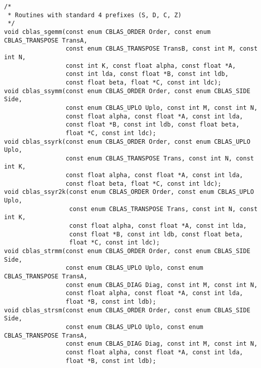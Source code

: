 \documentclass{article}
\begin{document}
\begin{Verbatim}[fontsize=\small,fontfamily=tt,fontshape=rm]
/* 
 * Routines with standard 4 prefixes (S, D, C, Z)
 */
void cblas_sgemm(const enum CBLAS_ORDER Order, const enum CBLAS_TRANSPOSE TransA,
                 const enum CBLAS_TRANSPOSE TransB, const int M, const int N,
                 const int K, const float alpha, const float *A,
                 const int lda, const float *B, const int ldb,
                 const float beta, float *C, const int ldc);
void cblas_ssymm(const enum CBLAS_ORDER Order, const enum CBLAS_SIDE Side,
                 const enum CBLAS_UPLO Uplo, const int M, const int N,
                 const float alpha, const float *A, const int lda,
                 const float *B, const int ldb, const float beta,
                 float *C, const int ldc);
void cblas_ssyrk(const enum CBLAS_ORDER Order, const enum CBLAS_UPLO Uplo,
                 const enum CBLAS_TRANSPOSE Trans, const int N, const int K,
                 const float alpha, const float *A, const int lda,
                 const float beta, float *C, const int ldc);
void cblas_ssyr2k(const enum CBLAS_ORDER Order, const enum CBLAS_UPLO Uplo,
                  const enum CBLAS_TRANSPOSE Trans, const int N, const int K,
                  const float alpha, const float *A, const int lda,
                  const float *B, const int ldb, const float beta,
                  float *C, const int ldc);
void cblas_strmm(const enum CBLAS_ORDER Order, const enum CBLAS_SIDE Side,
                 const enum CBLAS_UPLO Uplo, const enum CBLAS_TRANSPOSE TransA,
                 const enum CBLAS_DIAG Diag, const int M, const int N,
                 const float alpha, const float *A, const int lda,
                 float *B, const int ldb);
void cblas_strsm(const enum CBLAS_ORDER Order, const enum CBLAS_SIDE Side,
                 const enum CBLAS_UPLO Uplo, const enum CBLAS_TRANSPOSE TransA,
                 const enum CBLAS_DIAG Diag, const int M, const int N,
                 const float alpha, const float *A, const int lda,
                 float *B, const int ldb);


\end{Verbatim}
\end{document}
